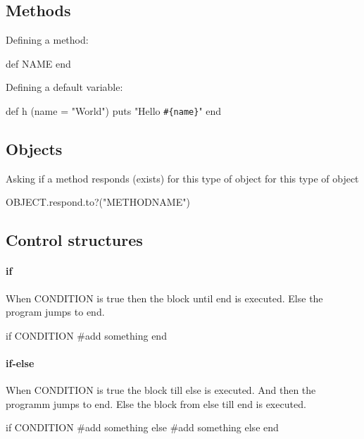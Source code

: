 \documentclass[10pt,a4paper]{scrartcl}
\begin{document}
\subsection{Methods} 

Defining a method:

\begin{terminalcode}
def NAME
end
\end{terminalcode}

\noindent Defining a default variable:

\begin{terminalcode}
def h (name = "World")
  puts "Hello \verb$#{name}$"
end
\end{terminalcode}

\subsection{Objects}

Asking if a method responds (exists) for this type of object for this type of object

\begin{terminalcode}
OBJECT.respond.to?("METHODNAME")
\end{terminalcode}



\subsection{Control structures}

\paragraph{if}
When CONDITION is true then the block until end is executed. Else the program jumps to end.
\begin{terminalcode}
if CONDITION
  #add something    
end
\end{terminalcode}
\paragraph{if-else}
When CONDITION is true the block till else is executed. And then the programm jumps to end. Else the block from else till end is executed.
\begin{terminalcode}
if CONDITION
  #add something
else
  #add something else
end
\end{terminalcode}
\end{document}
